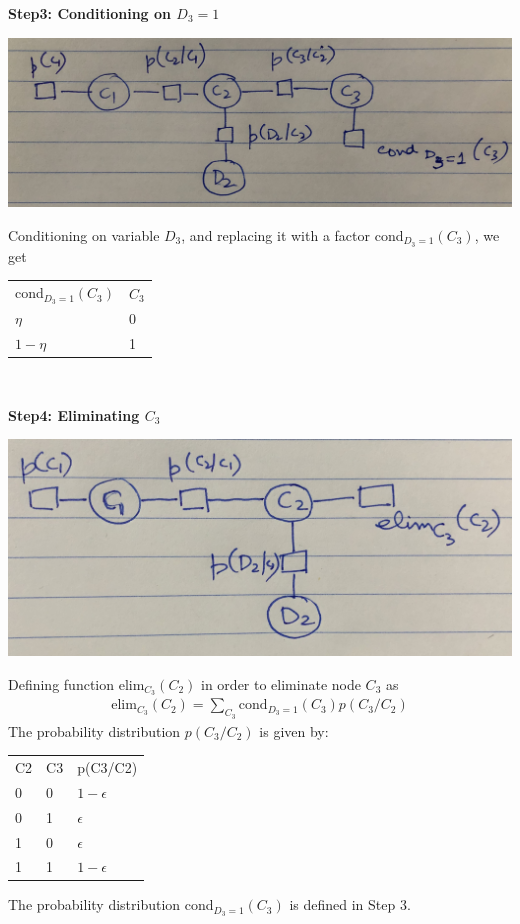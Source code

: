 \documentclass[12pt]{article}
\begin{document}
\begin{enumerate}[label=(\alph*)]
\begin{center}
  \end{center}
  \textbf{Step3: Conditioning on $D_3 = 1$} \\
  \begin{center}
  \includegraphics[scale=0.1]{IMG_2280.jpg}
  \end{center}
  Conditioning on variable $D_3$, and replacing it with a factor cond$_{D_3 = 1}(C_3)$, we get
  \begin{center}
  \begin{tabular}{ll}
  cond$_{D_3 = 1}(C_3)$ & $C_3$  \\
  $\eta$            & 0       \\
  $1-\eta$               & 1       \\
  \end{tabular} \newline \\
  \end{center}
  \textbf{Step4: Eliminating $C_3$}
  \begin{center}
  \includegraphics[scale=0.1]{IMG_2281.jpg}
  \end{center}
  Defining function elim$_{C_3}(C_2)$ in order to eliminate node $C_3$ as
  \begin{align*}
  \text{elim}_{C_3}(C_2) = \sum_{C_3} \text{cond}_{D_3 = 1}(C_3) p(C_3/C_2)
  \end{align*}
  The probability distribution $p(C_3/C_2)$ is given by:
  \begin{center}
  \begin{tabular}{lll}
  C2 & C3 & p(C3/C2)    \\
  0  & 0  & $1 - \epsilon$  \\
  0  & 1  & $\epsilon$      \\
  1  & 0  & $\epsilon$      \\
  1  & 1  & $1 - \epsilon$
  \end{tabular}
  \end{center}
  The probability distribution cond$_{D_3 = 1}(C_3)$ is defined in Step 3.
  

\end{enumerate}
\end{document}
